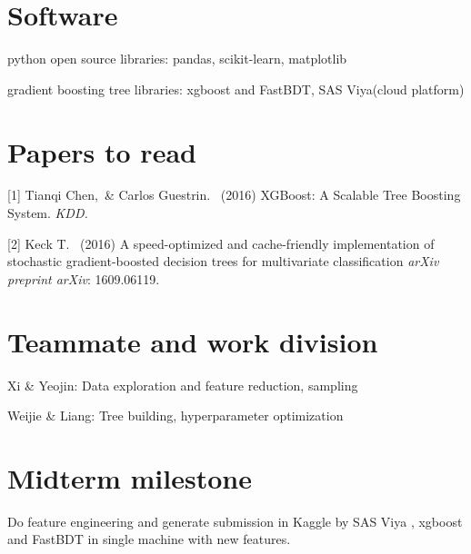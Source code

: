 \documentclass{article}
\begin{document}
\section{Software}

python open source libraries: pandas, scikit-learn, matplotlib

gradient boosting tree libraries: xgboost and FastBDT, SAS Viya(cloud platform)

\section{Papers to read}


[1] Tianqi Chen,\ \& Carlos Guestrin. \ (2016) XGBoost: A Scalable Tree Boosting System. {\it KDD.}

[2] Keck T. \ (2016) A speed-optimized and cache-friendly implementation of stochastic gradient-boosted decision trees for multivariate classification {\it arXiv preprint arXiv}: 1609.06119.



\section{Teammate and work division}

Xi \& Yeojin: Data exploration and feature reduction, sampling

Weijie \& Liang: Tree building, hyperparameter optimization





\section{Midterm milestone}
Do feature engineering and generate submission in Kaggle by SAS Viya , xgboost and FastBDT in single machine with new features.
\end{document}
